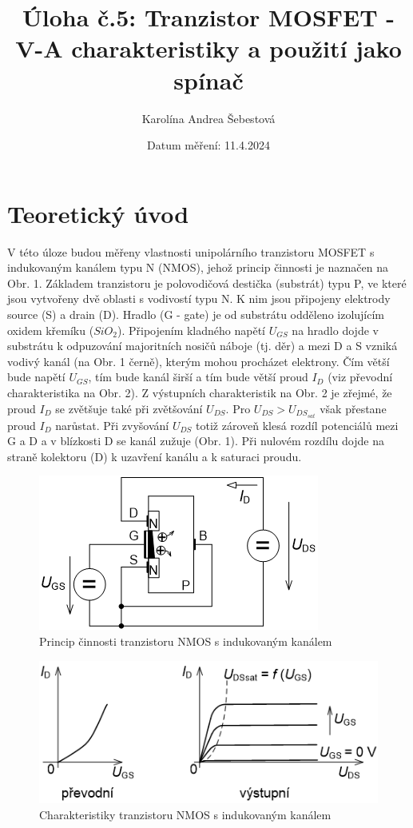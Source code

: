 \documentclass[a4paper, czech]{article}
\title{Úloha č.5: Tranzistor MOSFET - V-A charakteristiky a použití jako spínač}
\author{Karolína Andrea Šebestová}
\date{Datum měření: 11.4.2024}
\begin{document}
\maketitle

\section{Teoretický úvod}

V této úloze budou měřeny vlastnosti unipolárního tranzistoru MOSFET s indukovaným kanálem typu N (NMOS), jehož princip činnosti je naznačen na Obr. 1.
Základem tranzistoru je polovodičová destička (substrát) typu P, ve které jsou vytvořeny dvě oblasti s vodivostí typu N.
K nim jsou připojeny elektrody source (S) a drain (D).
Hradlo (G - gate) je od substrátu odděleno izolujícím oxidem křemíku ($SiO_2$).
Připojením kladného napětí $U_{GS}$ na hradlo dojde v substrátu k odpuzování majoritních nosičů náboje (tj. děr) a mezi D a S vzniká vodivý kanál (na Obr. 1 černě), kterým mohou procházet elektrony.
Čím větší bude napětí $U_{GS}$, tím bude kanál širší a tím bude větší proud $I_D$ (viz převodní charakteristika na Obr. 2).
Z výstupních charakteristik na Obr. 2 je zřejmé, že proud $I_D$ se zvětšuje také při zvětšování $U_{DS}$.
Pro $U_{DS} > U_{DS_{sat}}$ však přestane proud $I_D$ narůstat.
Při zvyšování $U_{DS}$ totiž zároveň klesá rozdíl potenciálů mezi G a D a v blízkosti D se kanál zužuje (Obr. 1).
Při nulovém rozdílu dojde na straně kolektoru (D) k uzavření kanálu a k saturaci proudu.

\begin{figure}[H]
    \centering
    \includegraphics{princip.png}
    \caption{Princip činnosti tranzistoru NMOS s indukovaným kanálem}
\end{figure}

\begin{figure}[H]
    \centering
    \includegraphics{charakteristiky.png}
    \caption{Charakteristiky tranzistoru NMOS s indukovaným kanálem}
\end{figure}
\end{document}
